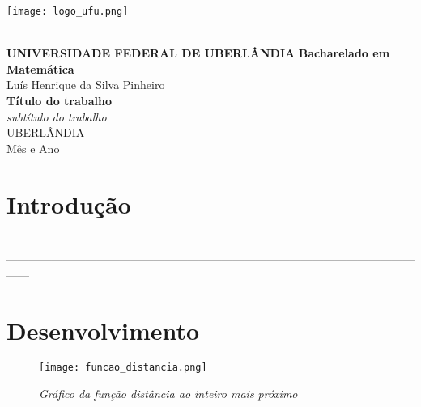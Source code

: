 \documentclass[12pt,twoside]{article}
\begin{document}

  \begin{titlepage}
    \begin{center}
      \parbox{3.5cm}{\texttt{[image: logo\_ufu.png]}} \\
      \vspace{1cm}
      {\Large \bf UNIVERSIDADE FEDERAL DE UBERLÂNDIA}
      {\large \bf Bacharelado em Matemática} \\
      \vspace{2cm}
      {\large Luís Henrique da Silva Pinheiro} \\
      \vspace{3cm}
      {\Large \bf Título do trabalho} \\
      {\large \it subtítulo do trabalho} \\
      \vspace{8cm}
      {UBERLÂNDIA \\ Mês e Ano}
    \end{center}
  \end{titlepage}

  \tableofcontents %
  \thispagestyle{empty} %
  \newpage %


  \section{Introdução}
    \cite{carothers} \cite{cariello}
    \lipsum[1] \\
    ------------------------------------------------------------------------------------------------------------------
    
    \newpage
  
  \section{Desenvolvimento}
    \lipsum[1]
        
    \begin{figure}[h!]
      \centering
      \texttt{[image: funcao\_distancia.png]}
      \caption{\it Gráfico da função distância ao inteiro mais próximo}
      \label{fig:my_label}
    \end{figure}
    
\end{document}
